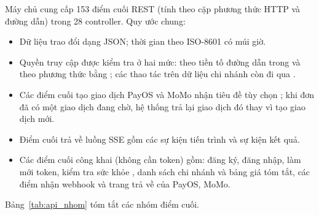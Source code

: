 Máy chủ cung cấp 153 điểm cuối REST (tính theo cặp phương thức HTTP và đường dẫn) trong 28 controller. Quy ước chung:
\begin{itemize}
    \item Dữ liệu trao đổi dạng JSON; thời gian theo ISO-8601 có múi giờ.
    \item Quyền truy cập được kiểm tra ở hai mức: theo tiền tố đường dẫn trong  và theo phương thức bằng ; các thao tác trên dữ liệu chi nhánh còn đi qua .
    \item Các điểm cuối tạo giao dịch PayOS và MoMo nhận tiêu đề tùy chọn ; khi đơn đã có một giao dịch đang chờ, hệ thống trả lại giao dịch đó thay vì tạo giao dịch mới.
    \item Điểm cuối  trả về luồng SSE gồm các sự kiện tiến trình và sự kiện kết quả.
    \item Các điểm cuối công khai (không cần token) gồm: đăng ký, đăng nhập, làm mới token, kiểm tra sức khỏe , danh sách chi nhánh và bảng giá tóm tắt, các điểm nhận webhook và trang trả về của PayOS, MoMo.
\end{itemize}

Bảng~\ref{tab:api_nhom} tóm tắt các nhóm điểm cuối.

